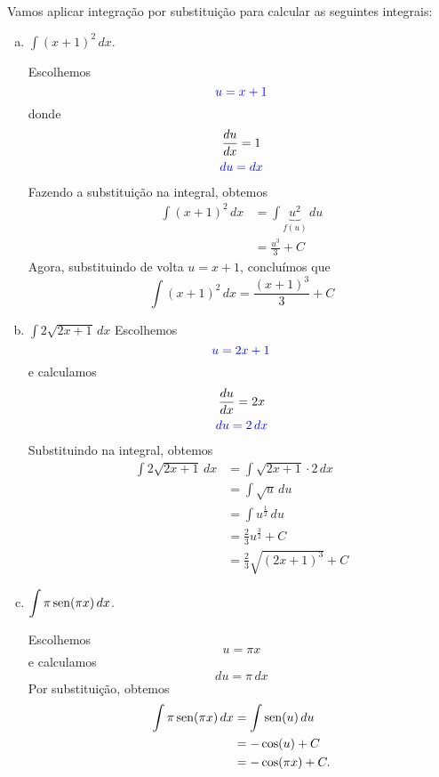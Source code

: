 \begin{ex}
  Vamos aplicar integração por substituição para calcular as seguintes integrais:
  \begin{enumerate}[a)]
  \item $\displaystyle\int (x+1)^2\,dx$.

    Escolhemos
    \begin{equation}
      {\color{blue}u = x + 1}
    \end{equation}
    donde
    \begin{gather}
      \frac{du}{dx} = 1\\
      {\color{blue}du = dx}
    \end{gather}
    Fazendo a substituição na integral, obtemos
    \begin{align*}
      \int (x+1)^2\,dx &= \int \underbrace{u^2}_{f(u)}\,du\\
                       &= \frac{u^3}{3} + C
    \end{align*}
    Agora, substituindo de volta $u = x+1$, concluímos que
    \begin{equation}
      \int (x+1)^2\,dx = \frac{(x+1)^3}{3} + C
    \end{equation}

  \item $\displaystyle \int 2\sqrt{2x+1}\,dx$
    Escolhemos
    \begin{equation}
      {\color{blue}u = 2x+1}
    \end{equation}
    e calculamos
    \begin{gather}
      \frac{du}{dx} = 2x\\
      {\color{blue}du = 2\,dx}
    \end{gather}
    Substituindo na integral, obtemos
    \begin{align*}
      \int 2\sqrt{2x+1}\,dx &= \int \sqrt{2x+1}\cdot 2\,dx\\
                            &= \int \sqrt{u}\,du\\
                            &= \int u^{\frac{1}{2}}\,du\\
                            &= \frac{2}{3}u^{\frac{3}{2}} + C\\
                            &= \frac{2}{3}\sqrt{(2x+1)^3} + C
    \end{align*}
    
  \item $\displaystyle\int \pi\operatorname{sen}(\pi x)\,dx$.

    Escolhemos
    \begin{equation}
      u = \pi x
    \end{equation}
    e calculamos
    \begin{equation}
      du = \pi\,dx
    \end{equation}
    Por substituição, obtemos
    \begin{align}
      \int \pi\operatorname{sen}(\pi x)\,dx &= \int \operatorname{sen}(u)\,du \\
                              &= -\cos(u) + C \\
                              &= -\cos(\pi x) + C.
    \end{align}
  \end{enumerate}
\end{ex}


